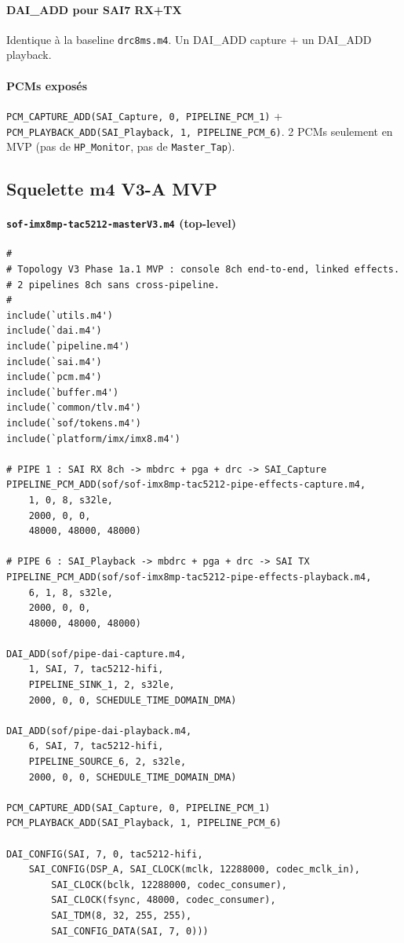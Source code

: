 \documentclass[11pt,a4paper]{article}
\begin{document}
\paragraph{DAI\_ADD pour SAI7 RX+TX}
Identique à la baseline \texttt{drc8ms.m4}. Un DAI\_ADD capture + un DAI\_ADD playback.

\paragraph{PCMs exposés}
\texttt{PCM\_CAPTURE\_ADD(SAI\_Capture, 0, PIPELINE\_PCM\_1)} + \texttt{PCM\_PLAYBACK\_ADD(SAI\_Playback, 1, PIPELINE\_PCM\_6)}. 2 PCMs seulement en MVP (pas de \texttt{HP\_Monitor}, pas de \texttt{Master\_Tap}).

\subsection{Squelette m4 V3-A MVP}

\paragraph{\texttt{sof-imx8mp-tac5212-masterV3.m4} (top-level)}

\begin{lstlisting}[language={}, basicstyle=\ttfamily\scriptsize]
#
# Topology V3 Phase 1a.1 MVP : console 8ch end-to-end, linked effects.
# 2 pipelines 8ch sans cross-pipeline.
#
include(`utils.m4')
include(`dai.m4')
include(`pipeline.m4')
include(`sai.m4')
include(`pcm.m4')
include(`buffer.m4')
include(`common/tlv.m4')
include(`sof/tokens.m4')
include(`platform/imx/imx8.m4')

# PIPE 1 : SAI RX 8ch -> mbdrc + pga + drc -> SAI_Capture
PIPELINE_PCM_ADD(sof/sof-imx8mp-tac5212-pipe-effects-capture.m4,
    1, 0, 8, s32le,
    2000, 0, 0,
    48000, 48000, 48000)

# PIPE 6 : SAI_Playback -> mbdrc + pga + drc -> SAI TX
PIPELINE_PCM_ADD(sof/sof-imx8mp-tac5212-pipe-effects-playback.m4,
    6, 1, 8, s32le,
    2000, 0, 0,
    48000, 48000, 48000)

DAI_ADD(sof/pipe-dai-capture.m4,
    1, SAI, 7, tac5212-hifi,
    PIPELINE_SINK_1, 2, s32le,
    2000, 0, 0, SCHEDULE_TIME_DOMAIN_DMA)

DAI_ADD(sof/pipe-dai-playback.m4,
    6, SAI, 7, tac5212-hifi,
    PIPELINE_SOURCE_6, 2, s32le,
    2000, 0, 0, SCHEDULE_TIME_DOMAIN_DMA)

PCM_CAPTURE_ADD(SAI_Capture, 0, PIPELINE_PCM_1)
PCM_PLAYBACK_ADD(SAI_Playback, 1, PIPELINE_PCM_6)

DAI_CONFIG(SAI, 7, 0, tac5212-hifi,
    SAI_CONFIG(DSP_A, SAI_CLOCK(mclk, 12288000, codec_mclk_in),
        SAI_CLOCK(bclk, 12288000, codec_consumer),
        SAI_CLOCK(fsync, 48000, codec_consumer),
        SAI_TDM(8, 32, 255, 255),
        SAI_CONFIG_DATA(SAI, 7, 0)))
\end{lstlisting}
\end{document}
